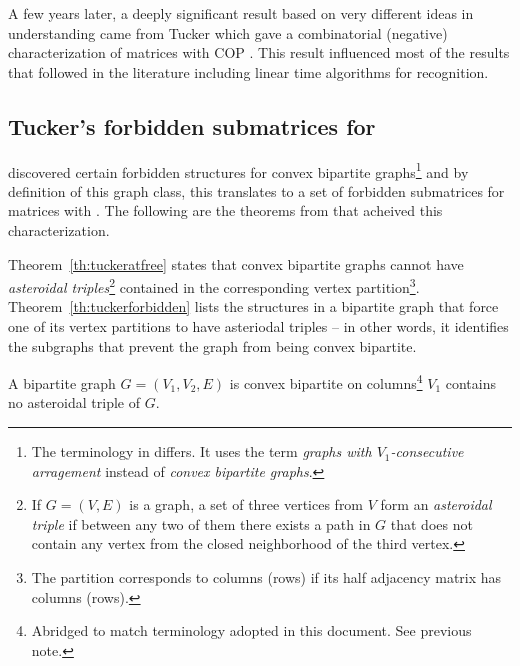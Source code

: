 A few years later, a deeply significant result based on very different
ideas in understanding \COP came from Tucker which gave a
combinatorial (negative) characterization of matrices with COP
\cite{at72}. This result influenced most of the \COP results that
followed in the literature including linear time
algorithms for \COP
recognition.


\subsection{Tucker's forbidden submatrices for \COP}
\label{sec:tucker}

\cite{at72} discovered certain forbidden structures for convex
bipartite graphs\footnote{The terminology in \cite{at72} differs. It
  uses the term {\em graphs with $V_1$-consecutive arragement} instead
  of {\em convex bipartite graphs}.} and by definition of this graph
class, this translates to a set of forbidden submatrices for matrices
with \cop.  The following are the theorems from \cite{at72} that
acheived this characterization.


Theorem~\ref{th:tuckeratfree} states that convex bipartite graphs
cannot have {\em asteroidal triples}\footnote{If $G = (V,E)$ is a
  graph, a set of three vertices from $V$ form an {\em asteroidal
    triple} if between any two of them there exists a path in $G$ that
  does not contain any vertex from the closed neighborhood of the
  third vertex.} contained in the corresponding vertex
partition\footnote{The partition corresponds to columns (rows) if its
  half adjacency matrix has \COP columns (rows).}.
Theorem~\ref{th:tuckerforbidden} lists the structures in a
bipartite graph that force one of its vertex partitions to have
asteriodal triples -- in other words, it identifies the subgraphs that
prevent the graph from being convex bipartite.


\begin{theoremsansproof}
  A bipartite graph $G = (V_1, V_2, E)$ is convex bipartite on
  columns\footnote{Abridged to match terminology adopted in this
    document. See previous note.} \iff $V_1$ contains no asteroidal
  triple of $G$.
  \label{th:tuckeratfree}
\end{theoremsansproof}

